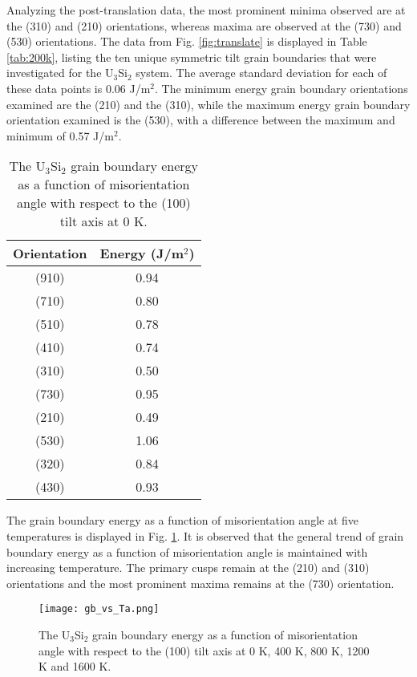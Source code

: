 \documentclass[review]{elsarticle}
\begin{document}
\FloatBarrier

Analyzing the post-translation data, the most prominent minima observed are at the (310) and (210) orientations, whereas maxima are observed at the (730) and (530) orientations. The data from Fig. \ref{fig:translate} is displayed in Table \ref{tab:200k}, listing the ten unique symmetric tilt grain boundaries that were investigated for the U$_{3}$Si$_{2}$ system. The average standard deviation for each of these data points is 0.06 J/m$^{2}$. The minimum energy grain boundary orientations examined are the (210) and the (310), while the maximum energy grain boundary orientation examined is the (530), with a difference between the maximum and minimum of 0.57 J/m$^{2}$. 

\begin{table}[h]
\caption{The U$_{3}$Si$_{2}$ grain boundary energy as a function of misorientation angle with respect to the (100) tilt axis at 0 K.} \label{tab:200k}
\begin{center}
\begin{tabular}{|c|c|}
	\hline
	Orientation & Energy (J/m$^{2}$) \\
	 \hline
	 (910) & 0.94 \\
	 (710) & 0.80 \\
	 (510) & 0.78 \\
	 (410) & 0.74 \\
	 (310) & 0.50 \\	 
	 (730) & 0.95 \\
	 (210) & 0.49 \\
	 (530) & 1.06 \\
	 (320) & 0.84 \\
	 (430) & 0.93 \\
	 \hline
\end{tabular}
\end{center}
\label{default}
\end{table}

\FloatBarrier

The grain boundary energy as a function of misorientation angle at five temperatures is displayed in Fig. \ref{fig:gbtemp}. It is observed that the general trend of grain boundary energy as a function of misorientation angle is maintained with increasing temperature. The primary cusps remain at the (210) and (310) orientations and the most prominent maxima remains at the (730) orientation. 

\begin{figure}[h]
 \centering
 \texttt{[image: gb\_vs\_Ta.png]} 
 \caption{The U$_{3}$Si$_{2}$ grain boundary energy as a function of misorientation angle with respect to the (100) tilt axis at 0 K, 400 K, 800 K, 1200 K and 1600 K.}
 \label{fig:gbtemp}
\end{figure}
\end{document}
